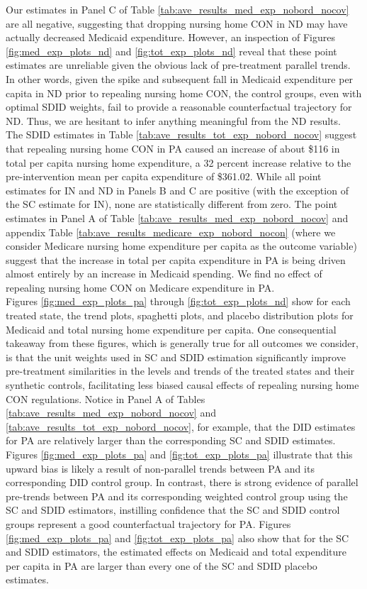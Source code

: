 \documentclass[../Main.tex]{subfiles}
\begin{document}
\indent Our estimates in Panel C of Table \ref{tab:ave_results_med_exp_nobord_nocov} are all negative, suggesting that dropping nursing home CON in ND may have actually decreased Medicaid expenditure. However, an inspection of Figures \ref{fig:med_exp_plots_nd} and \ref{fig:tot_exp_plots_nd} reveal that these point estimates are unreliable given the obvious lack of pre-treatment parallel trends. In other words, given the spike and subsequent fall in Medicaid expenditure per capita in ND prior to repealing nursing home CON, the control groups, even with optimal SDID weights, fail to provide a reasonable counterfactual trajectory for ND. Thus, we are hesitant to infer anything meaningful from the ND results.\\
\indent The SDID estimates in Table \ref{tab:ave_results_tot_exp_nobord_nocov} suggest that repealing nursing home CON in PA caused an increase of about \$116 in total per capita nursing home expenditure, a 32 percent increase relative to the pre-intervention mean per capita expenditure of \$361.02. While all point estimates for IN and ND in Panels B and C are positive (with the exception of the SC estimate for IN), none are statistically different from zero. The point estimates in Panel A of Table \ref{tab:ave_results_med_exp_nobord_nocov} and appendix Table \ref{tab:ave_results_medicare_exp_nobord_nocon} (where we consider Medicare nursing home expenditure per capita as the outcome variable) suggest that the increase in total per capita expenditure in PA is being driven almost entirely by an increase in Medicaid spending. We find no effect of repealing nursing home CON on Medicare expenditure in PA. \\
\indent Figures \ref{fig:med_exp_plots_pa} through \ref{fig:tot_exp_plots_nd} show for each treated state, the trend plots, spaghetti plots, and placebo distribution plots for Medicaid and total nursing home expenditure per capita. One consequential takeaway from these figures, which is generally true for all outcomes we consider, is that the unit weights used in SC and SDID estimation significantly improve pre-treatment similarities in the levels and trends of the treated states and their synthetic controls, facilitating less biased causal effects of repealing nursing home CON regulations. Notice in Panel A of Tables \ref{tab:ave_results_med_exp_nobord_nocov} and \ref{tab:ave_results_tot_exp_nobord_nocov}, for example, that the DID estimates for PA are relatively larger than the corresponding SC and SDID estimates. Figures \ref{fig:med_exp_plots_pa} and \ref{fig:tot_exp_plots_pa} illustrate that this upward bias is likely a result of non-parallel trends between PA and its corresponding DID control group. In contrast, there is strong evidence of parallel pre-trends between PA and its corresponding weighted control group using the SC and SDID estimators, instilling confidence that the SC and SDID control groups represent a good counterfactual trajectory for PA. Figures \ref{fig:med_exp_plots_pa} and \ref{fig:tot_exp_plots_pa} also show that for the SC and SDID estimators, the estimated effects on Medicaid and total expenditure per capita in PA are larger than every one of the SC and SDID placebo estimates.\\
\end{document}
